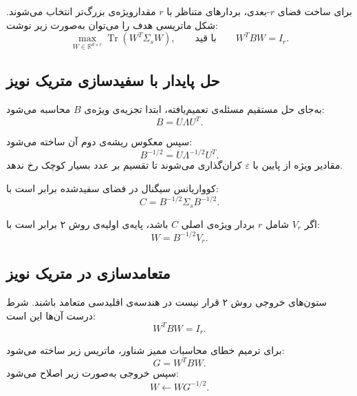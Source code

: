 \documentclass[a4paper,12pt]{article}
\begin{document}
برای ساخت فضای $r$-بعدی، بردارهای متناظر با $r$ مقدارویژه‌ی بزرگ‌تر انتخاب می‌شوند. شکل ماتریسی هدف را می‌توان به‌صورت زیر نوشت:
\begin{equation}
 \max_{W\in\mathbb{R}^{d\times r}}
 \operatorname{Tr}\!\left(W^{T}\Sigma_sW\right),
 \qquad
 \text{با قید}
 \qquad
 W^{T}BW=I_r.
\end{equation}

\subsection{حل پایدار با سفیدسازی متریک نویز}

به‌جای حل مستقیم مسئله‌ی تعمیم‌یافته، ابتدا تجزیه‌ی ویژه‌ی $B$ محاسبه می‌شود:
\begin{equation}
 B=U\Lambda U^{T}.
\end{equation}

سپس معکوس ریشه‌ی دوم آن ساخته می‌شود:
\begin{equation}
 B^{-1/2}
 =
 U\Lambda^{-1/2}U^{T}.
\end{equation}
مقادیر ویژه از پایین با $\varepsilon$ کران‌گذاری می‌شوند تا تقسیم بر عدد بسیار کوچک رخ ندهد.

کوواریانس سیگنال در فضای سفیدشده برابر است با:
\begin{equation}
 C
 =
 B^{-1/2}\Sigma_sB^{-1/2}.
\end{equation}

اگر $V_r$ شامل $r$ بردار ویژه‌ی اصلی $C$ باشد، پایه‌ی اولیه‌ی روش ۲ برابر است با:
\begin{equation}
 W=B^{-1/2}V_r.
\end{equation}

\subsection{متعامدسازی در متریک نویز}

ستون‌های خروجی روش ۲ قرار نیست در هندسه‌ی اقلیدسی متعامد باشند. شرط درست آن‌ها این است:
\begin{equation}
 W^{T}BW=I_r.
\end{equation}

برای ترمیم خطای محاسبات ممیز شناور، ماتریس زیر ساخته می‌شود:
\begin{equation}
 G=W^{T}BW.
\end{equation}
سپس خروجی به‌صورت زیر اصلاح می‌شود:
\begin{equation}
 W\leftarrow WG^{-1/2}.
\end{equation}
\end{document}
